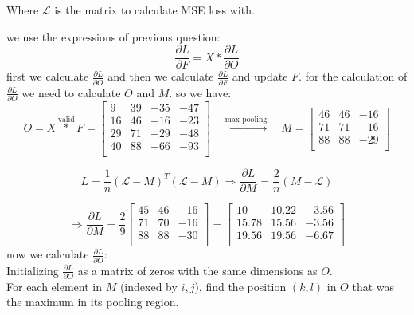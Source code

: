Where \(\mathcal{L}\) is the matrix to calculate MSE loss with.
\begin{qsolve}
    \begin{qsolve}[]
        we use the expressions of previous question:
        \[
        \frac{\partial L}{\partial F} = X * \frac{\partial L}{\partial O}
        \]
        first we calculate \(\frac{\partial L}{\partial O}\) and then we calculate \(\frac{\partial L}{\partial F}\) and update \(F\).
        for the calculation of \(\frac{\partial L}{\partial O}\) we need to calculate \(O\) and \(M\). so we have:
        \splitqsolve[\splitqsolve]
        \[
        O = X \overset{\text{valid}}{*} F = \begin{bmatrix}
        9 & 39 & -35 & -47 \\
        16 & 46 & -16 & -23 \\
        29 & 71 & -29 & -48 \\
        40 & 88 & -66 & -93 \\
        \end{bmatrix}
        \quad \xrightarrow{\text{max pooling}} \quad
        M = \begin{bmatrix}
        46 & 46 & -16 \\
        71 & 71 & -16 \\
        88 & 88 & -29 \\
        \end{bmatrix}
        \]

        \[
            L = \frac{1}{n} (\mathcal{L} - M)^T (\mathcal{L} - M) \Rightarrow \frac{\partial L}{\partial M} = \frac{2}{n} (M - \mathcal{L})
        \]

        \[
        \Rightarrow \frac{\partial L}{\partial M} =  \frac{2}{9} \begin{bmatrix}
        45 & 46 & -16 \\
        71 & 70 & -16 \\
        88 & 88 & -30 \\
        \end{bmatrix} = \begin{bmatrix}
        10 & 10.22 & -3.56 \\
        15.78 & 15.56 & -3.56 \\
        19.56 & 19.56 & -6.67 \\
        \end{bmatrix}
        \]
        now we calculate \(\frac{\partial L}{\partial O}\):\\
        Initializing \(\frac{\partial L}{\partial O}\) as a matrix of zeros with the same dimensions as \(O\).\\
        For each element in \(M\) (indexed by \(i, j\)), find the position \((k, l)\) in \(O\) that was the maximum in its pooling region.


\end{qsolve}
\end{qsolve}
